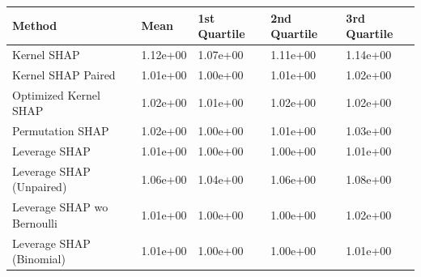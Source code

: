 \begin{tabular}{lllll}
  \toprule
  \textbf{Method} & \textbf{Mean} & \textbf{1st Quartile} & \textbf{2nd Quartile} & \textbf{3rd Quartile} \\ \midrule
Kernel SHAP & 1.12e+00 & 1.07e+00 & 1.11e+00 & 1.14e+00\\
Kernel SHAP Paired & \cellcolor{gold!60}1.01e+00 & \cellcolor{gold!60}1.00e+00 & 1.01e+00 & \cellcolor{bronze!60}1.02e+00\\
Optimized Kernel SHAP & 1.02e+00 & 1.01e+00 & 1.02e+00 & \cellcolor{bronze!60}1.02e+00\\
Permutation SHAP & 1.02e+00 & \cellcolor{gold!60}1.00e+00 & 1.01e+00 & 1.03e+00\\
Leverage SHAP & \cellcolor{gold!60}1.01e+00 & \cellcolor{gold!60}1.00e+00 & \cellcolor{gold!60}1.00e+00 & \cellcolor{gold!60}1.01e+00\\
Leverage SHAP (Unpaired) & 1.06e+00 & 1.04e+00 & 1.06e+00 & 1.08e+00\\
Leverage SHAP wo Bernoulli & \cellcolor{gold!60}1.01e+00 & \cellcolor{gold!60}1.00e+00 & \cellcolor{gold!60}1.00e+00 & \cellcolor{bronze!60}1.02e+00\\
Leverage SHAP (Binomial) & \cellcolor{gold!60}1.01e+00 & \cellcolor{gold!60}1.00e+00 & \cellcolor{gold!60}1.00e+00 & \cellcolor{gold!60}1.01e+00\\
\bottomrule
\end{tabular}
